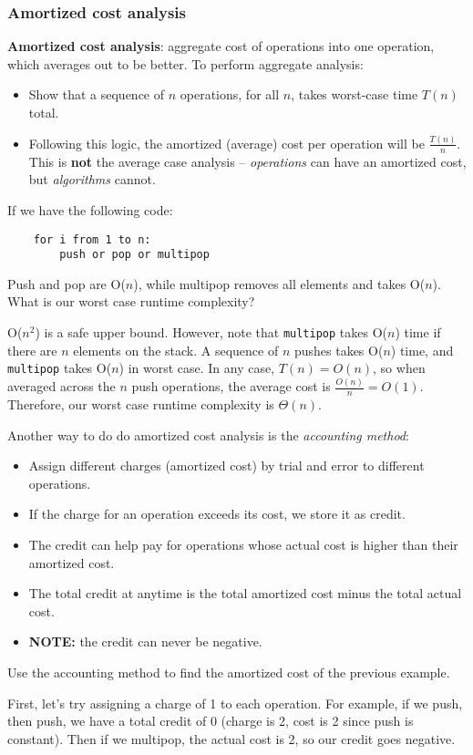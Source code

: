\documentclass[11pt]{article}
\begin{document}
\subsubsection{Amortized cost analysis}
\textbf{Amortized cost analysis}: aggregate cost of operations into one operation, which averages out to be better. To perform aggregate analysis:
\begin{itemize}
    \item Show that a sequence of $n$ operations, for all $n$, takes worst-case time $T(n)$ total.
    \item Following this logic, the amortized (average) cost per operation will be $\frac{T(n)}{n}$. This is \textbf{not} the average case analysis -- \textit{operations} can have an amortized cost, but \textit{algorithms} cannot.
\end{itemize}
\begin{exmp}
If we have the following code:
\begin{verbatim}
    for i from 1 to n:
        push or pop or multipop
\end{verbatim}
Push and pop are O($n$), while multipop removes all elements and takes O($n$). What is our worst case runtime complexity?
\end{exmp}
O($n^2$) is a safe upper bound. However, note that \texttt{multipop} takes O($n$) time if there are $n$ elements on the stack. A sequence of $n$ pushes takes O($n$) time, and \texttt{multipop} takes O($n$) in worst case. In any case, $T(n) = O(n)$, so when averaged across the $n$ push operations, the average cost is $\frac{O(n)}{n} = O(1)$. Therefore, our worst case runtime complexity is $\Theta(n)$.

Another way to do do amortized cost analysis is the \textit{accounting method}:
\begin{itemize}
    \item Assign different charges (amortized cost) by trial and error to different operations.
    \item If the charge for an operation exceeds its cost, we store it as credit.
    \item The credit can help pay for operations whose actual cost is higher than their amortized cost.
    \item The total credit at anytime is the total amortized cost minus the total actual cost.
    \item \textbf{NOTE:} the credit can never be negative.
\end{itemize}
\begin{exmp}
Use the accounting method to find the amortized cost of the previous example.
\end{exmp}
First, let's try assigning a charge of 1 to each operation. For example, if we push, then push, we have a total credit of 0 (charge is 2, cost is 2 since push is constant). Then if we multipop, the actual cost is 2, so our credit goes negative.
\end{document}
